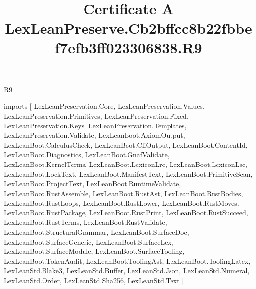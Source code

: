 \begin{lexlean}{R9}
\title{Certificate A LexLeanPreserve.Cb2bffcc8b22fbbef7efb3ff023306838.R9}
\begin{coremodule}
imports [
  LexLeanPreservation.Core,
  LexLeanPreservation.Values,
  LexLeanPreservation.Primitives,
  LexLeanPreservation.Fixed,
  LexLeanPreservation.Keys,
  LexLeanPreservation.Templates,
  LexLeanPreservation.Validate,
  LexLeanBoot.AxiomOutput,
  LexLeanBoot.CalculusCheck,
  LexLeanBoot.CliOutput,
  LexLeanBoot.ContentId,
  LexLeanBoot.Diagnostics,
  LexLeanBoot.GnafValidate,
  LexLeanBoot.KernelTerms,
  LexLeanBoot.LexiconLre,
  LexLeanBoot.LexiconLse,
  LexLeanBoot.LockText,
  LexLeanBoot.ManifestText,
  LexLeanBoot.PrimitiveScan,
  LexLeanBoot.ProjectText,
  LexLeanBoot.RuntimeValidate,
  LexLeanBoot.RustAssemble,
  LexLeanBoot.RustAst,
  LexLeanBoot.RustBodies,
  LexLeanBoot.RustLoops,
  LexLeanBoot.RustLower,
  LexLeanBoot.RustMoves,
  LexLeanBoot.RustPackage,
  LexLeanBoot.RustPrint,
  LexLeanBoot.RustSucceed,
  LexLeanBoot.RustTerms,
  LexLeanBoot.RustValidate,
  LexLeanBoot.StructuralGrammar,
  LexLeanBoot.SurfaceDoc,
  LexLeanBoot.SurfaceGeneric,
  LexLeanBoot.SurfaceLex,
  LexLeanBoot.SurfaceModule,
  LexLeanBoot.SurfaceTooling,
  LexLeanBoot.TokenAudit,
  LexLeanBoot.ToolingAst,
  LexLeanBoot.ToolingLatex,
  LexLeanStd.Blake3,
  LexLeanStd.Buffer,
  LexLeanStd.Json,
  LexLeanStd.Numeral,
  LexLeanStd.Order,
  LexLeanStd.Sha256,
  LexLeanStd.Text
]


\end{coremodule}
\end{lexlean}
